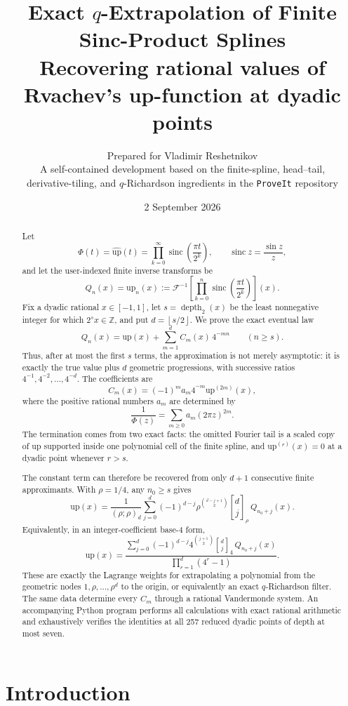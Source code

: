 \documentclass[11pt,oneside]{article}
\title{\bfseries Exact $q$-Extrapolation of Finite Sinc-Product Splines\\[0.35em]
\large Recovering rational values of Rvachev's up-function at dyadic points}
\author{Prepared for Vladimir Reshetnikov\\
\small A self-contained development based on the finite-spline, head--tail,\\
\small derivative-tiling, and $q$-Richardson ingredients in the \texttt{ProveIt} repository}
\date{2 September 2026}
\numberwithin{equation}{section}
\theoremstyle{definition}
\theoremstyle{remark}
\newcommand{\Z}{\mathbb{Z}}
\newcommand{\upf}{\mathrm{up}}
\newcommand{\sinc}{\operatorname{sinc}}
\newcommand{\F}{\mathcal{F}}
\newcommand{\floor}[1]{\left\lfloor #1\right\rfloor}
\newcommand{\qbinom}[3]{\genfrac{[}{]}{0pt}{}{#1}{#2}_{#3}}
\newcommand{\depth}{\operatorname{depth}_2}
\begin{document}
\maketitle

\begin{abstract}
Let
\[
 \Phi(t)=\widehat{\upf}(t)=\prod_{k=0}^{\infty}
 \sinc\!\left(\frac{\pi t}{2^k}\right),
 \qquad \sinc z=\frac{\sin z}{z},
\]
and let the user-indexed finite inverse transforms be
\[
 Q_n(x)=\upf_n(x):=\F^{-1}\!\left[
       \prod_{k=0}^{n}\sinc\!\left(\frac{\pi t}{2^k}\right)
      \right](x).
\]
Fix a dyadic rational $x\in[-1,1]$, let $s=\depth(x)$ be the least nonnegative
integer for which $2^s x\in\Z$, and put $d=\floor{s/2}$.  We prove the exact
eventual law
\[
 Q_n(x)=\upf(x)+\sum_{m=1}^{d} C_m(x)\,4^{-mn}\qquad(n\ge s).
\]
Thus, after at most the first $s$ terms, the approximation is not merely
asymptotic: it is exactly the true value plus $d$ geometric progressions, with
successive ratios $4^{-1},4^{-2},\ldots,4^{-d}$.  The coefficients are
\[
 C_m(x)=(-1)^m a_m4^{-m}\upf^{(2m)}(x),
\]
where the positive rational numbers $a_m$ are determined by
\[
 \frac1{\Phi(z)}=\sum_{m\ge0}a_m(2\pi z)^{2m}.
\]
The termination comes from two exact facts: the omitted Fourier tail is a scaled
copy of $\upf$ supported inside one polynomial cell of the finite spline, and
$\upf^{(r)}(x)=0$ at a dyadic point whenever $r>s$.

The constant term can therefore be recovered from only $d+1$ consecutive finite
approximants.  With $\rho=1/4$, any $n_0\ge s$ gives
\[
 \boxed{\displaystyle
 \upf(x)=\frac1{(\rho;\rho)_d}
 \sum_{j=0}^{d}(-1)^{d-j}\rho^{\binom{d-j+1}{2}}
 \qbinom{d}{j}{\rho}\,Q_{n_0+j}(x).}
\]
Equivalently, in an integer-coefficient base-$4$ form,
\[
 \boxed{\displaystyle
 \upf(x)=\frac{
 \sum_{j=0}^{d}(-1)^{d-j}4^{\binom{j+1}{2}}
 \qbinom{d}{j}{4}\,Q_{n_0+j}(x)}
 {\prod_{r=1}^{d}(4^r-1)}.}
\]
These are exactly the Lagrange weights for extrapolating a polynomial from the
geometric nodes $1,\rho,\ldots,\rho^d$ to the origin, or equivalently an exact
$q$-Richardson filter.  The same data determine every $C_m$ through a rational
Vandermonde system.  An accompanying Python program performs all calculations
with exact rational arithmetic and exhaustively verifies the identities at all
257 reduced dyadic points of depth at most seven.
\end{abstract}

\tableofcontents
\newpage

\section{Introduction}
\end{document}
